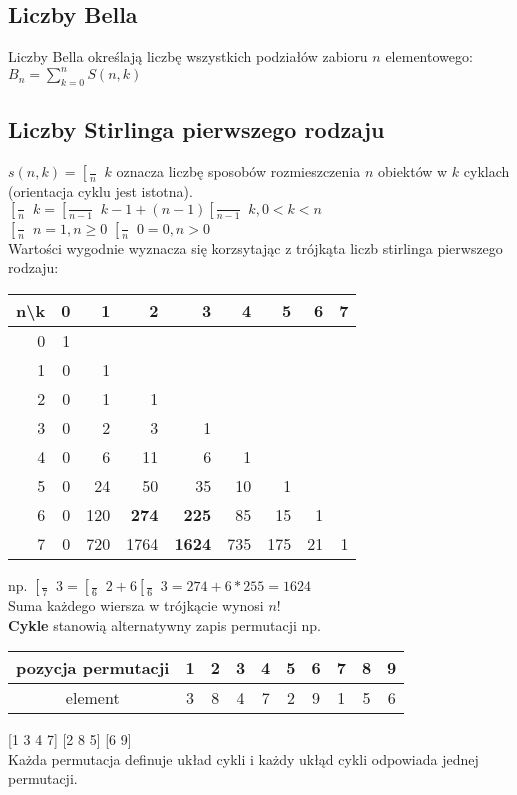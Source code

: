 \documentclass[a4paper,12pt]{article}
\DeclareRobustCommand{\stirling}{\genfrac [ ] {0pt}{}} %
\begin{document}
\subsection{Liczby Bella}
Liczby Bella określają liczbę wszystkich podziałów zabioru $n$ elementowego: $B_n=\sum^n_{k=0}S(n,k)$
\subsection{Liczby Stirlinga pierwszego rodzaju}
$s(n,k)=\stirling{n}{k}$ oznacza liczbę sposobów rozmieszczenia $n$ obiektów w $k$ cyklach (orientacja cyklu jest istotna). \\
$\stirling{n}{k}=\stirling{n-1}{k-1}+(n-1)\stirling{n-1}{k}, 0<k<n$ \\
$\stirling{n}{n}=1, n\geq0$ $\stirling{n}{0}=0, n>0$ \\
Wartości wygodnie wyznacza się korzsytając z trójkąta liczb stirlinga pierwszego rodzaju:\\
\begin{tabular}{|r|r|r|r|r|r|r|r|r|} 
 \hline
 n\textbackslash k & 0 & 1 & 2 & 3 & 4 & 5 & 6 & 7\\ \hline
 0&1&&&&&&& \\ \hline
 1&0&1&&&&&&\\ \hline
 2&0&1&1&&&&&\\ \hline
 3&0&2&3&1&&&&\\ \hline
 4&0&6&11&6&1&&&\\ \hline
 5&0&24&50&35&10&1&&\\ \hline
 6&0&120&\textbf{274}&\textbf{225}&85&15&1&\\ \hline
 7&0&720&1764&\textbf{1624}&735&175&21&1\\ \hline
\end{tabular}
np. $\stirling{7}{3}=\stirling{6}{2}+6\stirling{6}{3}=274+6*255=1624$ \\
Suma każdego wiersza w trójkącie wynosi $n!$ \\
\textbf{Cykle} stanowią alternatywny zapis permutacji np.\\
\begin{tabular}{c|c|c|c|c|c|c|c|c|c}
 pozycja permutacji &1 & 2& 3& 4&5&6&7&8&9\\ \hline
 element & 3 & 8 &4 &7 &2 &9 &1 & 5 &6 \\
\end{tabular}
[1 3 4 7] [2 8 5] [6 9] \\
Każda permutacja definuje układ cykli i każdy ukłąd cykli odpowiada jednej permutacji.
\end{document}
